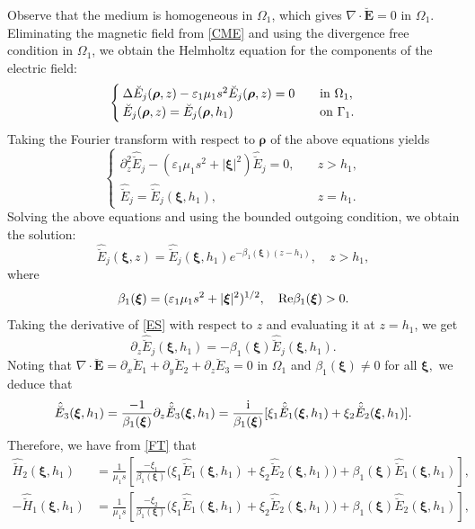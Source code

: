 \documentclass[11pt,reqno]{amsart}
\numberwithin{equation}{section}
\begin{document}
Observe that the medium is homogeneous in $\Omega_1$, which gives $\nabla \cdot
\breve {\boldsymbol E}=0$ in $\Omega_1.$ Eliminating the magnetic field from
\eqref{CME} and using the divergence free condition in $\Omega_1$, we obtain
the Helmholtz equation for the components of the electric field: 
\[
\begin{cases}
\Delta \breve {E}_j (\boldsymbol \rho,  z)-\varepsilon_1 \mu_1 s^2 \breve {E}_j
(\boldsymbol \rho, z)=0 \quad &{\rm in}~ \Omega_1,\\
\breve {E}_j (\boldsymbol \rho, z)= \breve E_j (\boldsymbol \rho, h_1) \quad
&{\rm on}~ \Gamma_1.
\end{cases}
\]
Taking the Fourier transform with respect to $\boldsymbol\rho$ of the above
equations yields
\[
\begin{cases}
\partial_z ^2 \hat {\breve E}_j  - (\varepsilon_1 \mu_1 s^2 +|\boldsymbol
\xi|^2) \hat {\breve E}_j=0, \quad & z>h_1,\\
\hat {\breve E}_j =\hat {\breve E}_j (\boldsymbol \xi, h_1), \quad & z=h_1.
\end{cases}
\]
Solving the above equations and using the bounded outgoing condition, we
obtain the solution:
\begin{equation}\label{ES}
\hat {\breve E}_j (\boldsymbol \xi, z)=\hat {\breve E}_j (\boldsymbol \xi, h_1)
e^{-\beta_1(\boldsymbol \xi) (z-h_1)}, \quad z>h_1,
\end{equation}
where
\[
\beta_1(\boldsymbol \xi)= (\varepsilon_1 \mu_1 s^2 +|\boldsymbol \xi|^2)^{1/2},
\quad {\rm Re} \beta_1 (\boldsymbol \xi)>0.
\]
Taking the derivative of \eqref{ES} with respect to $z$ and
evaluating it at $z=h_1$, we get 
\[
\partial_z \hat {\breve E}_j (\boldsymbol \xi, h_1)=-\beta_1 (\boldsymbol \xi)
\hat {\breve E}_j (\boldsymbol \xi, h_1).
\]
Noting that $\nabla \cdot \breve {\boldsymbol {E}}=\partial_x \breve {E}_1
+\partial_y \breve {E}_2 +\partial_z \breve E_3=0$ in $\Omega_1$ and
$\beta_1 (\boldsymbol \xi) \neq 0$ for all $\boldsymbol \xi,$ we deduce that
\[
\hat {\breve E}_3 (\boldsymbol \xi, h_1)= \frac{-1}{\beta_1 (\boldsymbol \xi)}
\partial_z \hat {\breve E}_3 (\boldsymbol \xi, h_1)=\frac{{\rm
i}}{\beta_1(\boldsymbol \xi)}[\xi_1 \hat {\breve E}_1(\boldsymbol \xi,
h_1)+\xi_2 \hat {\breve E}_2(\boldsymbol \xi, h_1)].
\]
Therefore, we have from \eqref{FT} that 
\begin{align*}
\hat {\breve H}_2(\boldsymbol \xi, h_1)&=\frac{1}{\mu_1 s}\left[ 
\frac{-\xi_1}{ \beta_1 (\boldsymbol \xi)} \bigl(\xi_1 \hat {\breve
E}_1(\boldsymbol \xi, h_1)+\xi_2 \hat {\breve E}_2(\boldsymbol \xi,
h_1)\bigr)+\beta_1(\boldsymbol \xi) \hat{ \breve {E}}_1(\boldsymbol \xi, h_1)
\right],\\
-\hat {\breve H}_1(\boldsymbol \xi, h_1)&=\frac{1}{\mu_1 s} \left[
\frac{-\xi_2}{\beta_1 (\boldsymbol \xi)} \bigl(\xi_1 \hat {\breve
E}_1(\boldsymbol \xi, h_1)+\xi_2 \hat {\breve E}_2 (\boldsymbol \xi, h_1)\bigr)
+\beta_1 (\boldsymbol \xi) \hat {\breve E}_2 (\boldsymbol \xi, h_1)\right],
\end{align*}
\end{document}
